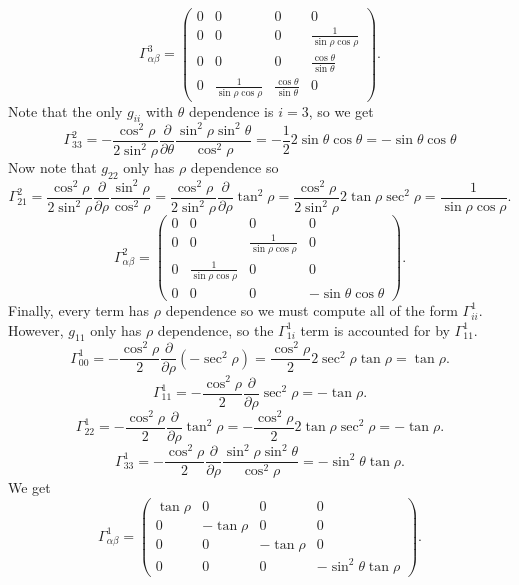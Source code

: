 \documentclass[11pt, letterpaper]{article}
\theoremstyle{plain}
\begin{document}
\[
	\Gamma^3_{\alpha \beta } =\begin{pmatrix}
	0 & 0 & 0 & 0 \\
	0 & 0 & 0 & \frac{1}{\sin \rho \cos \rho } \\
	0 & 0 & 0 & \frac{\cos \theta }{\sin \theta }  \\
	0 & \frac{1}{\sin \rho \cos \rho }  & \frac{\cos \theta }{\sin \theta }  & 0
	\end{pmatrix}
.\]
Note that the only $g_{ii} $ with $\theta $ dependence is $i=3$, so we get
\[
	\Gamma^2_{33} =-\frac{\cos ^2\rho }{2 \sin ^2\rho } \frac{\partial }{\partial \theta } \frac{\sin ^2\rho \sin ^2\theta }{\cos ^2\rho } =-\frac{1}{2} 2 \sin \theta \cos \theta =-\sin \theta \cos \theta 
\]
Now note that $g_{22} $ only has $\rho $ dependence so
\[
	\Gamma^2_{21} =\frac{\cos ^2\rho }{2 \sin ^2\rho } \frac{\partial }{\partial \rho } \frac{\sin ^2\rho }{\cos ^2\rho } =\frac{\cos ^2\rho }{2 \sin ^2\rho } \frac{\partial }{\partial \rho } \tan ^2\rho =\frac{\cos ^2\rho }{2 \sin ^2\rho } 2 \tan \rho \sec ^2\rho =\frac{1}{\sin \rho \cos \rho } 
.\]
\[
	\Gamma^2_{\alpha \beta } =\begin{pmatrix}
	0 & 0 & 0 & 0 \\
	0 & 0 & \frac{1}{\sin \rho \cos \rho }  & 0 \\
	0 & \frac{1}{\sin \rho \cos \rho }  & 0 & 0 \\
	0 & 0 & 0 & -\sin \theta \cos \theta 
	\end{pmatrix}
.\]
Finally, every term has $\rho $ dependence so we must compute all of the form $\Gamma ^1_{ii} $. However, $g_{11} $ only has $\rho $ dependence, so the $\Gamma ^1_{1i} $ term is accounted for by $\Gamma ^1_{11} $.
\[
	\Gamma^1_{00} =-\frac{\cos ^2\rho }{2} \frac{\partial }{\partial \rho } \left( -\sec ^2\rho  \right) =\frac{\cos ^2\rho }{2} 2 \sec ^2\rho \tan \rho =\tan \rho 
.\]
\[
	\Gamma^1_{11} =-\frac{\cos ^2\rho }{2} \frac{\partial }{\partial \rho } \sec ^2\rho =-\tan \rho 
.\]
\[
	\Gamma^1_{22} =-\frac{\cos ^2\rho }{2} \frac{\partial }{\partial \rho } \tan ^2\rho =-\frac{\cos ^2\rho }{2} 2 \tan \rho \sec ^2\rho =-\tan \rho 
.\]
\[
	\Gamma^1_{33} =-\frac{\cos ^2\rho }{2} \frac{\partial }{\partial \rho } \frac{\sin ^2\rho \sin ^2\theta }{\cos ^2\rho } =-\sin ^2\theta \tan \rho 
.\]
We get
\[
	\Gamma^1_{\alpha \beta } =\begin{pmatrix}
	\tan \rho   & 0 & 0 & 0 \\
	0 & - \tan \rho  & 0 & 0 \\
	0 & 0 & -\tan \rho  & 0 \\
	0 & 0 & 0 & -\sin ^2\theta \tan \rho 
	\end{pmatrix}
.\]
\end{document}
